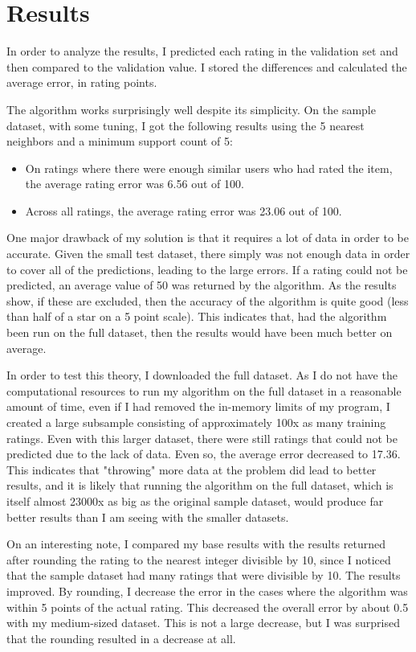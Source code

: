 \section{Results}

In order to analyze the results, I predicted each rating in the validation set
and then compared to the validation value. I stored the differences and
calculated the average error, in rating points.

The algorithm works surprisingly well despite its simplicity. On the sample
dataset, with some tuning, I got the following results using the 5 nearest
neighbors and a minimum support count of 5:
\begin{itemize}
   \item On ratings where there were enough similar users who had rated the
   item, the average rating error was 6.56 out of 100.
   \item Across all ratings, the average rating error was 23.06 out of 100.
\end{itemize}

One major drawback of my solution is that it requires a lot of data in order to
be accurate. Given the small test dataset, there simply was not enough data
in order to cover all of the predictions, leading to the large errors. If
a rating could not be predicted, an average value of 50 was returned by the
algorithm. As the results show, if these are excluded, then the accuracy of
the algorithm is quite good (less than half of a star on a 5 point scale).
This indicates that, had the algorithm been run on the full dataset, then the
results would have been much better on average.

In order to test this theory, I downloaded the full dataset. As I do not have
the computational resources to run my algorithm on the full dataset in a
reasonable amount of time, even if I had removed the in-memory limits of my
program, I created a large subsample consisting of approximately 100x as many
training ratings. Even with this larger dataset, there were still ratings that
could not be predicted due to the lack of data. Even so, the average error
decreased to 17.36. This indicates that "throwing" more data at the problem
did lead to better results, and it is likely that running the algorithm on the
full dataset, which is itself almost 23000x as big as the original sample
dataset, would produce far better results than I am seeing with the smaller
datasets.

On an interesting note, I compared my base results with the results returned
after rounding the rating to the nearest integer divisible by 10, since I
noticed that the sample dataset had many ratings that were divisible by 10.
The results improved. By rounding, I decrease the error in the cases where the
algorithm was within 5 points of the actual rating. This decreased the overall
error by about 0.5 with my medium-sized dataset. This is not a large decrease,
but I was surprised that the rounding resulted in a decrease at all.



